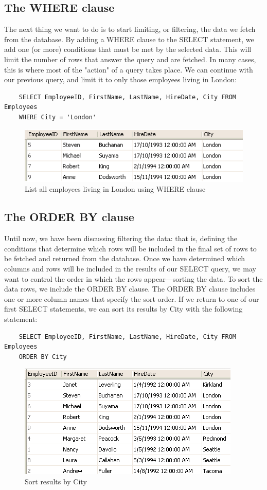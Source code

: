\documentclass[10pt,a4paper]{article}
\begin{document}
\subsection{The WHERE clause}
The next thing we want to do is to start limiting, or filtering, the data we fetch from the database. By adding a WHERE clause to the SELECT statement, we add one (or more) conditions that must be met by the selected data. This will limit the number of rows that answer the query and are fetched. In many cases, this is where most of the "action" of a query takes place. We can continue with our previous query, and limit it to only those employees living in London:
\begin{lstlisting}
	SELECT EmployeeID, FirstName, LastName, HireDate, City FROM Employees
	WHERE City = 'London'
	\end{lstlisting}
\begin{figure}[hbtp]
	\centering
	\includegraphics[scale=1]{WhereClause.png}
	\caption{List all employees living in London using WHERE clause}
	\end{figure}

\subsection{The ORDER BY clause}
Until now, we have been discussing filtering the data: that is, defining the conditions that determine which rows will be included in the final set of rows to be fetched and returned from the database. Once we have determined which columns and rows will be included in the results of our SELECT query, we may want to control the order in which the rows appear—sorting the data. To sort the data rows, we include the ORDER BY clause. The ORDER BY clause includes one or more column names that specify the sort order. If we return to one of our first SELECT statements, we can sort its results by City with the following statement:
\begin{lstlisting}
	SELECT EmployeeID, FirstName, LastName, HireDate, City FROM Employees
	ORDER BY City
	\end{lstlisting}
\begin{figure}[hbtp]
	\centering
	\includegraphics[scale=1]{Order.png}
	\caption{Sort results by City}
	\end{figure}
\end{document}
